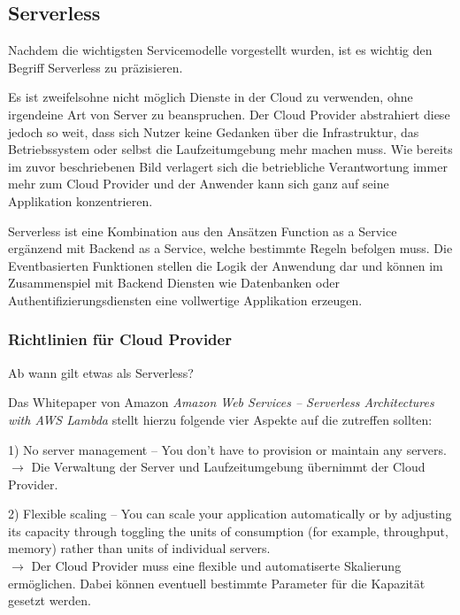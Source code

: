 \subsection{Serverless}
\label{Serverless}
Nachdem die wichtigsten Servicemodelle vorgestellt wurden, ist es wichtig den Begriff Serverless zu präzisieren.


Es ist zweifelsohne nicht möglich Dienste in der Cloud zu verwenden, ohne irgendeine Art von Server zu beanspruchen.
Der Cloud Provider abstrahiert diese jedoch so weit, dass sich Nutzer keine Gedanken über die Infrastruktur, das Betriebssystem oder selbst die Laufzeitumgebung mehr machen muss.
Wie bereits im zuvor beschriebenen Bild verlagert sich die betriebliche Verantwortung immer mehr zum Cloud Provider und der Anwender kann sich ganz auf seine Applikation konzentrieren.

Serverless ist eine Kombination aus den Ansätzen Function as a Service ergänzend mit Backend as a Service, welche bestimmte Regeln befolgen muss.
Die Eventbasierten Funktionen stellen die Logik der Anwendung dar und können im Zusammenspiel mit
Backend Diensten wie Datenbanken oder Authentifizierungsdiensten eine vollwertige Applikation erzeugen.



\subsubsection{Richtlinien für Cloud Provider }

Ab wann gilt etwas als Serverless?

Das Whitepaper von Amazon \textit{Amazon Web Services – Serverless Architectures with AWS Lambda} \cite[Seite 1]{AWSWhitepaper}
stellt hierzu folgende vier Aspekte auf die zutreffen sollten:

1) \glqq No server management – You don’t have to provision or maintain any servers.\grqq
  \\ $\rightarrow$ Die Verwaltung der Server und Laufzeitumgebung übernimmt der Cloud Provider.

2) \glqq Flexible scaling – You can scale your application automatically or by adjusting its capacity through toggling the units of consumption (for example, throughput, memory) rather than units of individual servers.\grqq
\\ $\rightarrow$ Der Cloud Provider muss eine flexible und automatiserte Skalierung ermöglichen. Dabei können eventuell bestimmte Parameter für die Kapazität gesetzt werden.

